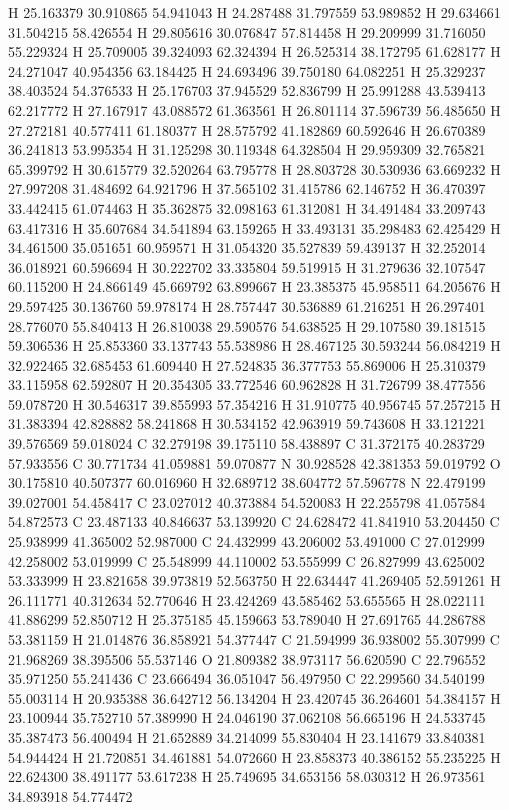 \documentclass{article}
\begin{document}
H 25.163379 30.910865 54.941043 
H 24.287488 31.797559 53.989852 
H 29.634661 31.504215 58.426554 
H 29.805616 30.076847 57.814458 
H 29.209999 31.716050 55.229324 
H 25.709005 39.324093 62.324394 
H 26.525314 38.172795 61.628177 
H 24.271047 40.954356 63.184425 
H 24.693496 39.750180 64.082251 
H 25.329237 38.403524 54.376533 
H 25.176703 37.945529 52.836799 
H 25.991288 43.539413 62.217772 
H 27.167917 43.088572 61.363561 
H 26.801114 37.596739 56.485650 
H 27.272181 40.577411 61.180377 
H 28.575792 41.182869 60.592646 
H 26.670389 36.241813 53.995354 
H 31.125298 30.119348 64.328504 
H 29.959309 32.765821 65.399792 
H 30.615779 32.520264 63.795778 
H 28.803728 30.530936 63.669232 
H 27.997208 31.484692 64.921796 
H 37.565102 31.415786 62.146752 
H 36.470397 33.442415 61.074463 
H 35.362875 32.098163 61.312081 
H 34.491484 33.209743 63.417316 
H 35.607684 34.541894 63.159265 
H 33.493131 35.298483 62.425429 
H 34.461500 35.051651 60.959571 
H 31.054320 35.527839 59.439137 
H 32.252014 36.018921 60.596694 
H 30.222702 33.335804 59.519915 
H 31.279636 32.107547 60.115200 
H 24.866149 45.669792 63.899667 
H 23.385375 45.958511 64.205676 
H 29.597425 30.136760 59.978174 
H 28.757447 30.536889 61.216251 
H 26.297401 28.776070 55.840413 
H 26.810038 29.590576 54.638525 
H 29.107580 39.181515 59.306536 
H 25.853360 33.137743 55.538986 
H 28.467125 30.593244 56.084219 
H 32.922465 32.685453 61.609440 
H 27.524835 36.377753 55.869006 
H 25.310379 33.115958 62.592807 
H 20.354305 33.772546 60.962828 
H 31.726799 38.477556 59.078720 
H 30.546317 39.855993 57.354216 
H 31.910775 40.956745 57.257215 
H 31.383394 42.828882 58.241868 
H 30.534152 42.963919 59.743608 
H 33.121221 39.576569 59.018024 
C 32.279198 39.175110 58.438897 
C 31.372175 40.283729 57.933556 
C 30.771734 41.059881 59.070877 
N 30.928528 42.381353 59.019792 
O 30.175810 40.507377 60.016960 
H 32.689712 38.604772 57.596778 
N 22.479199 39.027001 54.458417 
C 23.027012 40.373884 54.520083 
H 22.255798 41.057584 54.872573 
C 23.487133 40.846637 53.139920 
C 24.628472 41.841910 53.204450 
C 25.938999 41.365002 52.987000 
C 24.432999 43.206002 53.491000 
C 27.012999 42.258002 53.019999 
C 25.548999 44.110002 53.555999 
C 26.827999 43.625002 53.333999 
H 23.821658 39.973819 52.563750 
H 22.634447 41.269405 52.591261 
H 26.111771 40.312634 52.770646 
H 23.424269 43.585462 53.655565 
H 28.022111 41.886299 52.850712 
H 25.375185 45.159663 53.789040 
H 27.691765 44.286788 53.381159 
H 21.014876 36.858921 54.377447 
C 21.594999 36.938002 55.307999 
C 21.968269 38.395506 55.537146 
O 21.809382 38.973117 56.620590 
C 22.796552 35.971250 55.241436 
C 23.666494 36.051047 56.497950 
C 22.299560 34.540199 55.003114 
H 20.935388 36.642712 56.134204 
H 23.420745 36.264601 54.384157 
H 23.100944 35.752710 57.389990 
H 24.046190 37.062108 56.665196 
H 24.533745 35.387473 56.400494 
H 21.652889 34.214099 55.830404 
H 23.141679 33.840381 54.944424 
H 21.720851 34.461881 54.072660 
H 23.858373 40.386152 55.235225 
H 22.624300 38.491177 53.617238 
H 25.749695 34.653156 58.030312 
H 26.973561 34.893918 54.774472 
~     
    
\end{document}
